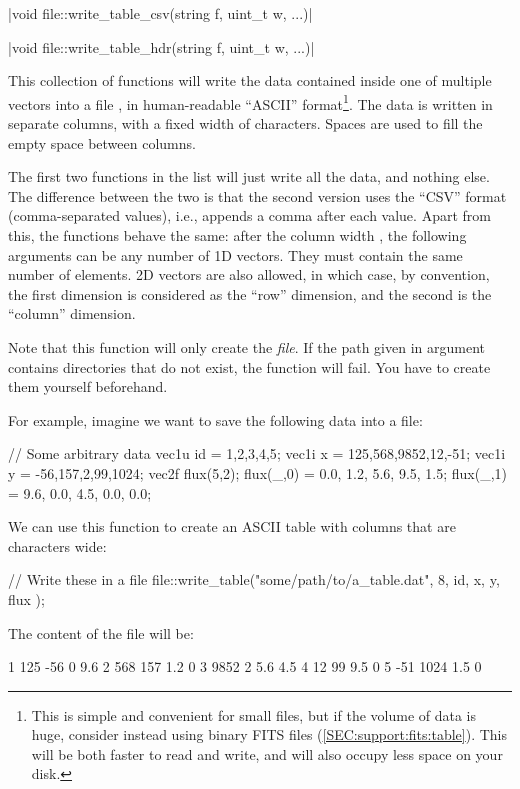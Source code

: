 \cppinline|void file::write_table_csv(string f, uint_t w, ...)| 

\cppinline|void file::write_table_hdr(string f, uint_t w, ...)| 

This collection of functions will write the data contained inside one of multiple vectors into a file , in human-readable ``ASCII'' format\footnote{This is simple and convenient for small files, but if the volume of data is huge, consider instead using binary FITS files (\ref{SEC:support:fits:table}). This will be both faster to read and write, and will also occupy less space on your disk.}. The data is written in separate columns, with a fixed width of  characters. Spaces are used to fill the empty space between columns.

The first two functions in the list will just write all the data, and nothing else. The difference between the two is that the second version uses the ``CSV'' format (comma-separated values), i.e., appends a comma after each value. Apart from this, the functions behave the same: after the column width , the following arguments can be any number of 1D vectors. They must contain the same number of elements. 2D vectors are also allowed, in which case, by convention, the first dimension is considered as the ``row'' dimension, and the second is the ``column'' dimension.

Note that this function will only create the \emph{file}. If the path  given in argument contains directories that do not exist, the function will fail. You have to create them yourself beforehand.

For example, imagine we want to save the following data into a file:
\begin{cppcode}
// Some arbitrary data
vec1u id = {1,2,3,4,5};
vec1i x = {125,568,9852,12,-51};
vec1i y = {-56,157,2,99,1024};
vec2f flux(5,2);
flux(_,0) = {0.0, 1.2, 5.6, 9.5, 1.5};
flux(_,1) = {9.6, 0.0, 4.5, 0.0, 0.0};
\end{cppcode}

We can use this function to create an ASCII table with columns that are  characters wide:
\begin{cppcode}
// Write these in a file
file::write_table("some/path/to/a_table.dat", 8,
    id, x, y, flux
);
\end{cppcode}

The content of the file will be:
\begin{bashcode}
       1     125     -56       0     9.6
       2     568     157     1.2       0
       3    9852       2     5.6     4.5
       4      12      99     9.5       0
       5     -51    1024     1.5       0
\end{bashcode}

